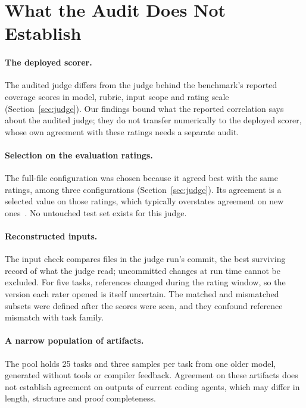 \section{What the Audit Does Not Establish}
\label{sec:validity}

\paragraph{The deployed scorer.}
The audited judge differs from the judge behind the benchmark's reported coverage scores in model, rubric, input scope and rating scale (Section~\ref{sec:judge}).
Our findings bound what the reported correlation says about the audited judge; they do not transfer numerically to the deployed scorer, whose own agreement with these ratings needs a separate audit.

\paragraph{Selection on the evaluation ratings.}
The full-file configuration was chosen because it agreed best with the same ratings, among three configurations (Section~\ref{sec:judge}).
Its agreement is a selected value on those ratings, which typically overstates agreement on new ones~\citep{cawley2010overfitting}.
No untouched test set exists for this judge.

\paragraph{Reconstructed inputs.}
The input check compares files in the judge run's commit, the best surviving record of what the judge read; uncommitted changes at run time cannot be excluded.
For five tasks, references changed during the rating window, so the version each rater opened is itself uncertain.
The matched and mismatched subsets were defined after the scores were seen, and they confound reference mismatch with task family.

\paragraph{A narrow population of artifacts.}
The pool holds 25 tasks and three samples per task from one older model, generated without tools or compiler feedback.
Agreement on these artifacts does not establish agreement on outputs of current coding agents, which may differ in length, structure and proof completeness.

